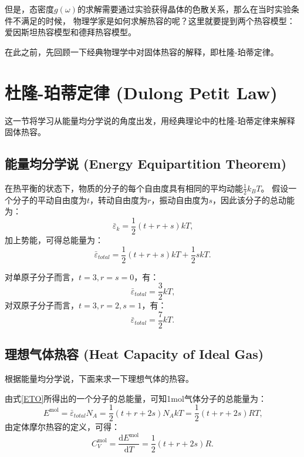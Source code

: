 \documentclass[declarePage]{ecnuthesis}
\begin{document}
但是，态密度$g(\omega)$的求解需要通过实验获得晶体的色散关系，那么在当时实验条件不满足的时候，%
物理学家是如何求解热容的呢？这里就要提到两个热容模型：爱因斯坦热容模型和德拜热容模型。

在此之前，先回顾一下经典物理学中对固体热容的解释，即杜隆-珀蒂定律。

\section{杜隆-珀蒂定律 (Dulong Petit Law)}

这一节将学习从能量均分学说的角度出发，用经典理论中的杜隆-珀蒂定律来解释固体热容。

\subsection{能量均分学说 (Energy Equipartition Theorem)}

在热平衡的状态下，物质的分子的每个自由度具有相同的平均动能$\frac{1}{2}k_BT$。%
假设一个分子的平动自由度为$t$，转动自由度为$r$，振动自由度为$s$，因此该分子的总动能为：
\begin{equation}
    \bar \varepsilon _k = \frac{1}{2} (t+r+s)kT \text{,}
\end{equation}
加上势能，可得总能量为：
\begin{equation}
    \bar \varepsilon _{total} = \frac{1}{2} (t+r+s)kT + \frac{1}{2}skT \text{.} \label{ETO}
\end{equation}

对单原子分子而言，$t=3,r=s=0$，有：
\begin{equation}
    \bar \varepsilon _{total} = \frac{3}{2} kT \text{,}
\end{equation}
对双原子分子而言，$t=3,r=2,s=1$，有：
\begin{equation}
    \bar \varepsilon _{total} = \frac{7}{2} kT \text{.} 
\end{equation}

\subsection{理想气体热容 (Heat Capacity of Ideal Gas)}

根据能量均分学说，下面来求一下理想气体的热容。

由式\ref{ETO}所得出的一个分子的总能量，可知1mol气体分子的总能量为：
\begin{equation}
    E^{\mathrm{mol}} = \bar \varepsilon _{total} N_A = \frac{1}{2} (t+r+2s)N_AkT = \frac{1}{2} (t+r+2s)RT \text{,}
\end{equation}
由定体摩尔热容的定义，可得：
\begin{equation}
    C_V^{\mathrm{mol}} = \frac{\mathrm{d}E^{\mathrm{mol}}}{\mathrm{d}T} = \frac{1}{2} (t+r+2s)R \text{.} 
\end{equation}
\end{document}
